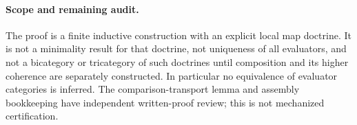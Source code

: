 \documentclass{article}
\begin{document}
\paragraph{Scope and remaining audit.} The proof is a finite inductive construction with an explicit local map doctrine. It is not a minimality result for that doctrine, not uniqueness of all evaluators, and not a bicategory or tricategory of such doctrines until composition and its higher coherence are separately constructed. In particular no equivalence of evaluator categories is inferred. The comparison-transport lemma and assembly bookkeeping have independent written-proof review; this is not mechanized certification.
\end{document}
